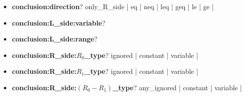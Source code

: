 \documentclass[onecolumn]{ctexart}
\begin{document}
\begin{itemize}
\begin{itemize}
        \item  \textbf{conclusion:direction}? \qquad
            {\color{LimeGreen} only\_R\_side}  |
            {\color{blue}      eq}   |
            {\color{blue}      neq}  |
            {\color{blue}      leq}  |
            {\color{blue}      geq}  |
            {\color{blue}      le}   |
            {\color{blue}      ge}   |

        \item  \textbf{\color{gray} conclusion:L\_side:variable}? \qquad

        \item  \textbf{\color{gray} conclusion:L\_side:range}? \qquad


        \item  \textbf{conclusion:R\_side:$R_0$\_type}? \qquad \qquad \qquad \quad
            {\color{red}       ignored}   |
            {\color{LimeGreen} constant}  |
            {\color{LimeGreen} variable}  |

        \item  \textbf{conclusion:R\_side:$R_1$\_type}? \qquad \qquad \qquad \quad
            {\color{red}       ignored}   |
            {\color{LimeGreen} constant}  |
            {\color{LimeGreen} variable}  |

        \item  \textbf{conclusion:R\_side:$(R_0 - R_1)$\_type}? \qquad
            {\color{red}       any\_ignored}   |
            {\color{LimeGreen} constant}  |
            {\color{red}       variable}  |


    \end{itemize}
\end{itemize}
\end{document}
